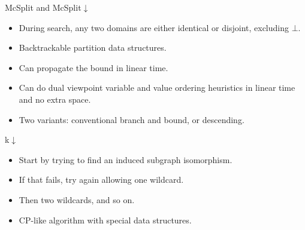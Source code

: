 \documentclass{beamer}
\begin{document}
\begin{frame}{McSplit and McSplit{$\downarrow$}}
    \begin{itemize}
        \item During search, any two domains are either identical or disjoint, excluding $\bot$.
        \item Backtrackable partition data structures.
        \item Can propagate the bound in linear time.
        \item Can do dual viewpoint variable and value ordering heuristics in linear time and no
            extra space.
        \item Two variants: conventional branch and bound, or descending.
    \end{itemize}
\end{frame}

\begin{frame}{k{$\downarrow$}}
    \begin{itemize}
        \item Start by trying to find an induced subgraph isomorphism.
        \item If that fails, try again allowing one wildcard.
        \item Then two wildcards, and so on.
        \item CP-like algorithm with special data structures.
    \end{itemize}
\end{frame}
\end{document}
